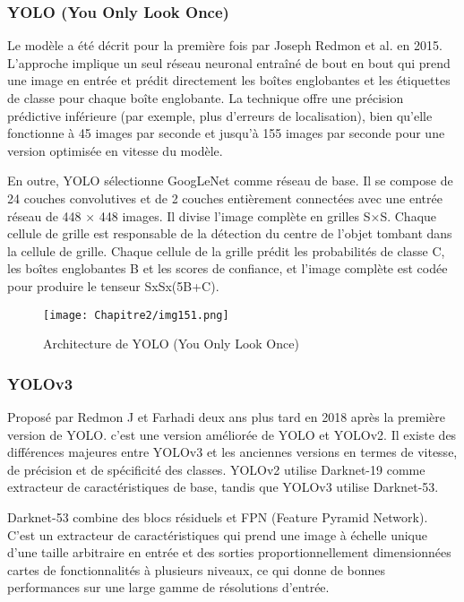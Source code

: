 \subsubsection{YOLO (You Only Look Once) \cite{yolo_paper} }

Le modèle a été décrit pour la première fois par Joseph Redmon et al. en 2015. 
L'approche implique un seul réseau neuronal entraîné de bout en bout qui prend une image en entrée et prédit directement les boîtes englobantes et les étiquettes de classe pour chaque boîte englobante. La technique offre une précision prédictive inférieure (par exemple, plus d'erreurs de localisation), bien qu'elle fonctionne à 45 images par seconde et jusqu'à 155 images par seconde pour une version optimisée en vitesse du modèle.

En outre, YOLO sélectionne GoogLeNet comme réseau de base. Il se compose de 24 couches convolutives et de 2 couches entièrement connectées avec une entrée réseau de 448 × 448 images. Il divise l'image complète en grilles S×S. Chaque cellule de grille est responsable de la détection du centre de l'objet tombant dans la cellule de grille. Chaque cellule de la grille prédit les probabilités de classe C, les boîtes englobantes B et les scores de confiance, et l'image complète est codée pour produire le tenseur SxSx(5B+C).
     \begin{figure}[H]
          \centering
          \texttt{[image: Chapitre2/img151.png]}
          \caption{Architecture de YOLO (You Only Look Once)}
          \label{img15}
          \end{figure}

\subsubsection{YOLOv3 \cite{yolov3_paper}} 

Proposé par Redmon J et Farhadi deux ans plus tard en 2018 après la première version de YOLO. c'est une version améliorée de YOLO et YOLOv2. Il existe des différences majeures entre YOLOv3 et les anciennes versions en termes de vitesse, de précision et de spécificité des classes. YOLOv2 utilise Darknet-19 comme extracteur de caractéristiques de base, tandis que YOLOv3 utilise Darknet-53.    
    
Darknet-53  combine des blocs résiduels et FPN (Feature Pyramid Network). C'est un extracteur de caractéristiques qui prend une image à échelle unique d'une taille arbitraire en entrée et des sorties proportionnellement dimensionnées cartes de fonctionnalités à plusieurs niveaux, ce qui donne de bonnes performances sur une large gamme de résolutions d'entrée.

